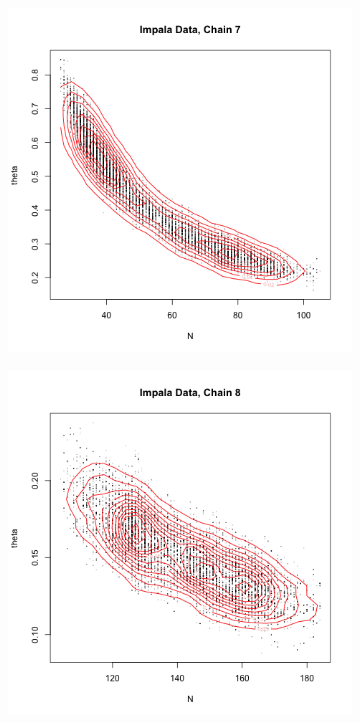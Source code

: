 \documentclass[10pt,psamsfonts]{amsart}
\theoremstyle{definition}
\theoremstyle{remark}
\numberwithin{equation}{section}
\begin{document}
\begin{figure}
\begin{subfigure}[b]{0.3\textwidth}
	\end{subfigure}
	\begin{subfigure}[b]{0.3\textwidth}
		\includegraphics[width=\textwidth]{wonlee_mcmc_impala_7.png}
	\end{subfigure}
	\begin{subfigure}[b]{0.3\textwidth}
		\includegraphics[width=\textwidth]{wonlee_mcmc_impala_8.png}

\end{subfigure}
\end{figure}
\end{document}
